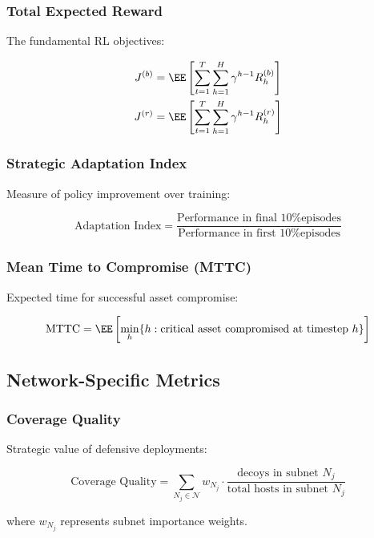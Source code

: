 \documentclass[12pt,oneside]{article}
\begin{document}
\subsubsection{Total Expected Reward}
The fundamental RL objectives:

\begin{align}
J^{(b)} &= \EE\left[\sum_{t=1}^{T} \sum_{h=1}^{H} \gamma^{h-1} R_h^{(b)}\right] \\
J^{(r)} &= \EE\left[\sum_{t=1}^{T} \sum_{h=1}^{H} \gamma^{h-1} R_h^{(r)}\right]
\end{align}

\subsubsection{Strategic Adaptation Index}
Measure of policy improvement over training:

\begin{equation}
\text{Adaptation Index} = \frac{\text{Performance in final 10\% episodes}}{\text{Performance in first 10\% episodes}}
\end{equation}

\subsubsection{Mean Time to Compromise (MTTC)}
Expected time for successful asset compromise:

\begin{equation}
\text{MTTC} = \EE\left[\min_h \{h : \text{critical asset compromised at timestep } h\}\right]
\end{equation}

\subsection{Network-Specific Metrics}

\subsubsection{Coverage Quality}
Strategic value of defensive deployments:

\begin{equation}
\text{Coverage Quality} = \sum_{N_j \in \mathcal{N}} w_{N_j} \cdot \frac{\text{decoys in subnet } N_j}{\text{total hosts in subnet } N_j}
\end{equation}

where $w_{N_j}$ represents subnet importance weights.
\end{document}
